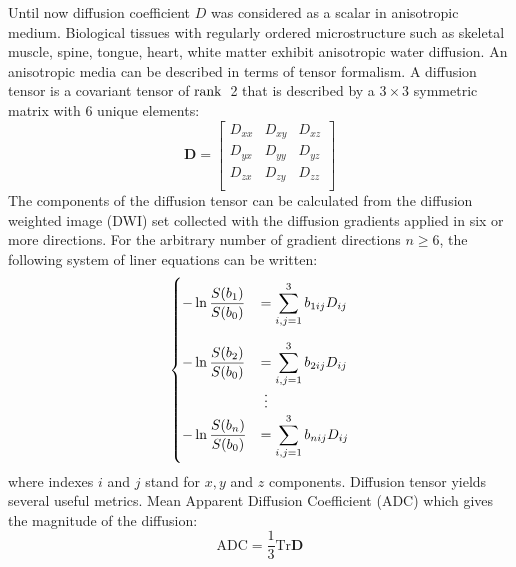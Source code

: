 Until now diffusion coefficient $D$ was considered as a scalar in anisotropic medium. 
Biological tissues with regularly ordered microstructure such as skeletal muscle, spine, tongue, heart, white matter exhibit anisotropic water diffusion. 
An anisotropic media can be described in terms of tensor formalism. 
A diffusion tensor is a covariant tensor of $\operatorname{rank}$~2 that is described by a $3\times3$ symmetric matrix with 6 unique elements:
\begin{equation}
\mathbf{D} =\left[
\begin{array}{ccc}
D_{xx} & D_{xy} & D_{xz} \\[4pt]
D_{yx} & D_{yy} & D_{yz} \\[4pt]
D_{zx} & D_{zy} & D_{zz} \\
\end{array}\right]
\end{equation}
The components of the diffusion tensor can be calculated from the diffusion weighted image (DWI) set collected with the diffusion gradients applied in six or more directions. 
For the arbitrary number of gradient directions $n \geq 6$, the following system of liner equations can be written:
\begin{align}
\begin{cases}
-\ln{\dfrac{S(b_1)}{S(b_0)}}&=\displaystyle\sum_{i,j=1}^3 b_{1ij}D_{ij}\\[2em]
-\ln{\dfrac{S(b_2)}{S(b_0)}}&=\displaystyle\sum_{i,j=1}^3 b_{2ij}D_{ij}\\
&\setbox0\hbox{=}\mathrel{\makebox[\wd0]{\vdots}} \\
-\ln{\dfrac{S(b_n)}{S(b_0)}}&=\displaystyle\sum_{i,j=1}^3 b_{nij}D_{ij}\\
\end{cases}
\end{align}
where indexes $i$ and $j$ stand for $x,y$ and $z$ components.
Diffusion tensor yields several useful metrics. Mean Apparent Diffusion Coefficient (ADC) which gives the magnitude of the diffusion:
\begin{equation}
\mathrm{ADC}=\frac{1}{3}\mathrm{Tr}\mathbf{D}
\end{equation}
